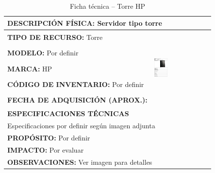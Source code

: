 
\begin{table}[H]
\centering
\caption{Ficha técnica -- Torre HP}
\label{tab:torre-hp-1}
\begin{tabular}{|p{}|p{}|}
\hline
\multicolumn{2}{|l|}{\textbf{DESCRIPCIÓN FÍSICA:} Servidor tipo torre} \\ \hline
\textbf{TIPO DE RECURSO:} Torre & 
\multirow{5}{*}{\includegraphics[width=0.25\textwidth,height=4cm,keepaspectratio]{tablas-images/cp1/torres/torre-1.png}} \\ \cline{1-1}
\textbf{MODELO:} Por definir & \\ \cline{1-1}
\textbf{MARCA:} HP & \\ \cline{1-1}
\textbf{CÓDIGO DE INVENTARIO:} Por definir & \\ \cline{1-1}
\textbf{FECHA DE ADQUISICIÓN (APROX.):} & \\ \hline
\multicolumn{2}{|l|}{\textbf{ESPECIFICACIONES TÉCNICAS}} \\ \hline
\multicolumn{2}{|p{0.95\textwidth}|}{
\footnotesize
Especificaciones por definir según imagen adjunta
} \\ \hline
\multicolumn{2}{|l|}{\textbf{PROPÓSITO:} Por definir} \\ \hline
\multicolumn{2}{|l|}{\textbf{IMPACTO:} Por evaluar} \\ \hline
\multicolumn{2}{|l|}{\textbf{OBSERVACIONES:} Ver imagen para detalles} \\ \hline
\end{tabular}
\end{table}


